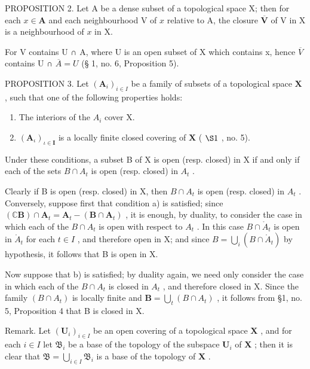 PROPOSITION 2. Let A be a dense subset of a topological space X; then for each \(x \in \mathbf{A}\) and each neighbourhood V of \(x\) relative to A, the closure \(\overline{\mathbf{V}}\) of V in X is a neighbourhood of \(x\) in X.

For V contains U ∩ A, where U is an open subset of X which contains x, hence \(\overline{V}\) contains U ∩ \(\overline{A} = U\) (§ 1, no. 6, Proposition 5).

PROPOSITION 3. Let \((\mathbf{A}_i)_{i\in I}\) be a family of subsets of a topological space \(\mathbf{X}\) , such that one of the following properties holds:

\begin{enumerate}
\def\labelenumi{\alph{enumi})}
\item
  The interiors of the \(A_{i}\) cover X.
\item
  \((\mathbf{A}_{\iota})_{\iota \in \mathbf{I}}\) is a locally finite closed covering of \(\mathbf{X}\) ( \(\S 1\) , no. 5).
\end{enumerate}

Under these conditions, a subset B of X is open (resp. closed) in X if and only if each of the sets \(B \cap A_{t}\) is open (resp. closed) in \(A_{t}\) .

Clearly if B is open (resp. closed) in X, then \(B \cap A_{t}\) is open (resp. closed) in \(A_{t}\) . Conversely, suppose first that condition a) is satisfied; since \((\mathbb{C}\mathbf{B}) \cap \mathbf{A}_{t} = \mathbf{A}_{t} - (\mathbf{B} \cap \mathbf{A}_{t})\) , it is enough, by duality, to consider the case in which each of the \(B \cap A_{t}\) is open with respect to \(A_{t}\) . In this case \(B \cap \mathring{A}_{t}\) is open in \(\mathring{A}_{t}\) for each \(t \in I\) , and therefore open in X; and since \(B = \bigcup_{i} (B \cap \mathring{A}_{t})\) by hypothesis, it follows that B is open in X.

Now suppose that b) is satisfied; by duality again, we need only consider the case in which each of the \(B \cap A_{t}\) is closed in \(A_{t}\) , and therefore closed in X. Since the family \((B \cap A_{t})\) is locally finite and \(\mathbf{B} = \bigcup_{t} (B \cap A_{t})\) , it follows from §1, no. 5, Proposition 4 that B is closed in X.

Remark. Let \((\mathbf{U}_i)_{i\in I}\) be an open covering of a topological space \(\mathbf{X}\) , and for each \(i\in I\) let \(\mathfrak{B}_i\) be a base of the topology of the subspace \(\mathbf{U}_i\) of \(\mathbf{X}\) ; then it is clear that \(\mathfrak{B} = \bigcup_{i\in I}\mathfrak{B}_i\) is a base of the topology of \(\mathbf{X}\) .

